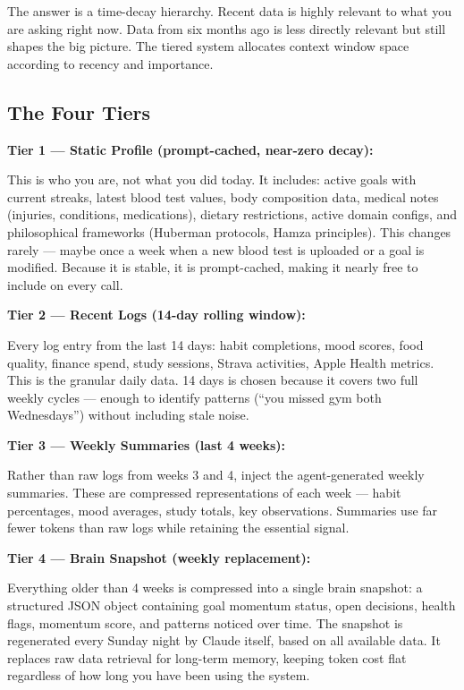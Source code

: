 \documentclass[12pt, a4paper]{article}
\begin{document}
The answer is a time-decay hierarchy. Recent data is highly relevant to what you are asking right now. Data from six months ago is less directly relevant but still shapes the big picture. The tiered system allocates context window space according to recency and importance.

\subsection{The Four Tiers}

\textbf{Tier 1 --- Static Profile (prompt-cached, near-zero decay):}

This is who you are, not what you did today. It includes: active goals with current streaks, latest blood test values, body composition data, medical notes (injuries, conditions, medications), dietary restrictions, active domain configs, and philosophical frameworks (Huberman protocols, Hamza principles). This changes rarely --- maybe once a week when a new blood test is uploaded or a goal is modified. Because it is stable, it is prompt-cached, making it nearly free to include on every call.

\textbf{Tier 2 --- Recent Logs (14-day rolling window):}

Every log entry from the last 14 days: habit completions, mood scores, food quality, finance spend, study sessions, Strava activities, Apple Health metrics. This is the granular daily data. 14 days is chosen because it covers two full weekly cycles --- enough to identify patterns (``you missed gym both Wednesdays'') without including stale noise.

\textbf{Tier 3 --- Weekly Summaries (last 4 weeks):}

Rather than raw logs from weeks 3 and 4, inject the agent-generated weekly summaries. These are compressed representations of each week --- habit percentages, mood averages, study totals, key observations. Summaries use far fewer tokens than raw logs while retaining the essential signal.

\textbf{Tier 4 --- Brain Snapshot (weekly replacement):}

Everything older than 4 weeks is compressed into a single brain snapshot: a structured JSON object containing goal momentum status, open decisions, health flags, momentum score, and patterns noticed over time. The snapshot is regenerated every Sunday night by Claude itself, based on all available data. It replaces raw data retrieval for long-term memory, keeping token cost flat regardless of how long you have been using the system.
\end{document}
